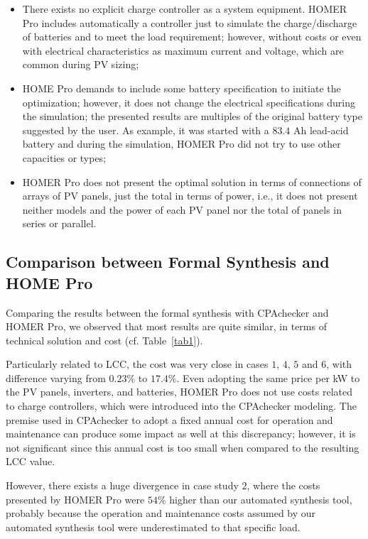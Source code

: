 \documentclass[review]{elsarticle}
\begin{document}
\begin{itemize}
\item There exists no explicit charge controller 
as a system equipment. HOMER Pro includes automatically 
a controller just to simulate the charge/discharge 
of batteries and to meet the load requirement; however, 
without costs or even with electrical characteristics 
as maximum current and voltage, which are common during PV sizing;
\item HOME Pro demands to include some battery specification 
to initiate the optimization; however, it does not change 
the electrical specifications during the simulation; 
the presented results are multiples of the original 
battery type suggested by the user. As example, it was 
started with a $83.4$ Ah lead-acid battery and during 
the simulation, HOMER Pro did not try to use other capacities or types;
\item HOMER Pro does not present the optimal solution 
in terms of connections of arrays of PV panels, just the 
total in terms of power, i.e., it does not present neither models 
and the power of each PV panel nor the total of panels in series or parallel. 
\end{itemize}

\subsection{Comparison between Formal Synthesis and HOME Pro}

Comparing the results between the formal synthesis with CPAchecker 
and HOMER Pro, we observed that most results are quite similar, 
in terms of technical solution and cost (cf. Table~\ref{tab1}). 

Particularly related to LCC, the cost was very close in cases 
$1$, $4$, $5$ and $6$, with difference varying from $0.23$\% to $17.4$\%. 
Even adopting the same price per kW to the PV panels, 
inverters, and batteries, HOMER Pro does not use costs 
related to charge controllers, which were introduced into the 
CPAchecker modeling. The premise used in CPAchecker to adopt 
a fixed annual cost for operation and maintenance can produce 
some impact as well at this discrepancy; however, it is not significant
since this annual cost is too small when compared to the resulting LCC value.

However, there exists a huge divergence in case study $2$, 
where the costs presented by HOMER Pro were $54$\% higher 
than our automated synthesis tool, probably because the 
operation and maintenance costs assumed by our automated 
synthesis tool were underestimated to that specific load. 
\end{document}
